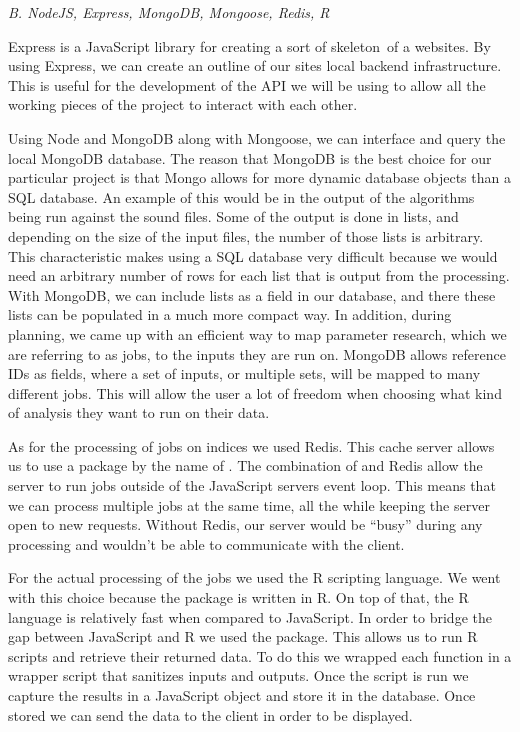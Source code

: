 \begin{flushleft}
\noindent
\textit{B. NodeJS, Express, MongoDB, Mongoose, Redis, R}\par
Express is a JavaScript library for creating a sort of \textquotesingle skeleton\textquotesingle\ of a website\textquotesingle s. By using Express, we can create an outline of our site\textquotesingle s local backend infrastructure. This is useful for the development of the API we will be using to allow all the working pieces of the project to interact with each other.\par
Using Node and MongoDB along with Mongoose, we can interface and query the local MongoDB database. The reason that MongoDB is the best choice for our particular project is that Mongo allows for more dynamic database objects than a SQL database. An example of this would be in the output of the algorithms being run against the sound files. Some of the output is done in lists, and depending on the size of the input files, the number of those lists is arbitrary. This characteristic makes using a SQL database very difficult because we would need an arbitrary number of rows for each list that is output from the processing. With MongoDB, we can include lists as a field in our database, and there these lists can be populated in a much more compact way. In addition, during planning, we came up with an efficient way to map parameter research, which we are referring to as jobs, to the inputs they are run on. MongoDB allows reference IDs as fields, where a set of inputs, or multiple sets, will be mapped to many different jobs. This will allow the user a lot of freedom when choosing what kind of analysis they want to run on their data.\par
As for the processing of jobs on indices we used Redis. This cache server allows us to use a package by the name of . The combination of  and Redis allow the server to run jobs outside of the JavaScript server\textquotesingle s event loop. This means that we can process multiple jobs at the same time, all the while keeping the server open to new requests. Without Redis, our server would be ``busy'' during any processing and wouldn't be able to communicate with the client.\par
For the actual processing of the jobs we used the R scripting language. We went with this choice because the  package is written in R. On top of that, the R language is relatively fast when compared to JavaScript. In order to bridge the gap between JavaScript and R we used the  package. This allows us to run R scripts and retrieve their returned data. To do this we wrapped each  function in a wrapper script that sanitizes inputs and outputs. Once the script is run we capture the results in a JavaScript object and store it in the database. Once stored we can send the data to the client in order to be displayed.\par

\end{flushleft}
